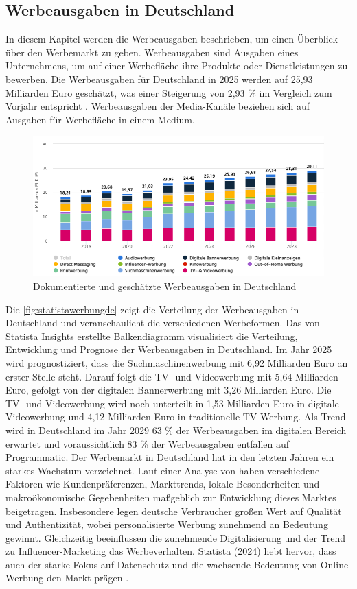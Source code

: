 \subsection{Werbeausgaben in Deutschland}
\label{werbeausgaben}
In diesem Kapitel werden die Werbeausgaben beschrieben, um einen Überblick über den Werbemarkt zu geben. Werbeausgaben sind Ausgaben eines Unternehmens, um auf einer Werbefläche ihre Produkte oder Dienstleistungen zu bewerben. Die Werbeausgaben für Deutschland in 2025 werden auf 25,93 Milliarden Euro geschätzt, was einer Steigerung von 2,93 \% im Vergleich zum Vorjahr entspricht \cite{statista_werbung}. Werbeausgaben der Media-Kanäle beziehen sich auf Ausgaben für Werbefläche in einem Medium. 
\begin{figure}[H]
    \centering
    \includegraphics[width=0.90\linewidth]{images/werbede.png}
    \caption{Dokumentierte und geschätzte Werbeausgaben in Deutschland \cite{statista_werbung}}
    \label{fig:statistawerbungde}
\end{figure}
\noindent
Die \autoref{fig:statistawerbungde} zeigt die Verteilung der Werbeausgaben in Deutschland und veranschaulicht die verschiedenen Werbeformen. Das von Statista Insights erstellte Balkendiagramm visualisiert die Verteilung, Entwicklung und Prognose der Werbeausgaben in Deutschland. Im Jahr 2025 wird prognostiziert, dass die Suchmaschinenwerbung mit 6,92 Milliarden Euro an erster Stelle steht. Darauf folgt die TV- und Videowerbung mit 5,64 Milliarden Euro, gefolgt von der digitalen Bannerwerbung mit 3,26 Milliarden Euro. Die TV- und Videowerbung wird noch unterteilt in 1,53 Milliarden Euro in digitale Videowerbung und 4,12 Milliarden Euro in traditionelle TV-Werbung. Als Trend wird in Deutschland im Jahr 2029 63 \% der Werbeausgaben im digitalen Bereich erwartet und voraussichtlich 83 \% der Werbeausgaben entfallen auf Programmatic. Der Werbemarkt in Deutschland hat in den letzten Jahren ein starkes Wachstum verzeichnet. Laut einer Analyse von \cite{statista_werbung} haben verschiedene Faktoren wie Kundenpräferenzen, Markttrends, lokale Besonderheiten und makroökonomische Gegebenheiten maßgeblich zur Entwicklung dieses Marktes beigetragen. Insbesondere legen deutsche Verbraucher großen Wert auf Qualität und Authentizität, wobei personalisierte Werbung zunehmend an Bedeutung gewinnt. Gleichzeitig beeinflussen die zunehmende Digitalisierung und der Trend zu Influencer-Marketing das Werbeverhalten. Statista (2024) hebt hervor, dass auch der starke Fokus auf Datenschutz und die wachsende Bedeutung von Online-Werbung den Markt prägen \cite{statista_werbung}.
